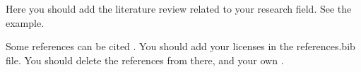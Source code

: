 Here you should add the literature review related to your research field. See the example.

Some references can be cited \cite{alves2018,alves2022,alves2023}. You should add your licenses in the references.bib file. You should delete the references from there, and your own \cite{alves2022}.

\lipsum[1-5]